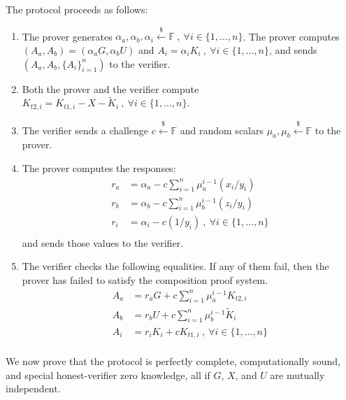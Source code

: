 \documentclass{article}
\theoremstyle{plain}
\theoremstyle{remark}
\begin{document}
The protocol proceeds as follows:
\begin{enumerate}
\item The prover generates $\alpha_a, \alpha_b, \alpha_i \xleftarrow{\$}\mathbb{F}\ ,\ \forall i\in\{1,\ldots,n\}$. The prover computes $(A_a, A_b) = (\alpha_a G, \alpha_b U)$ and $A_{i}=\alpha_i K_i\ ,\ \forall i\in\{1,\ldots,n\}$, and sends $(A_a, A_b, \{A_i\}_{i=1}^n)$ to the verifier.
\item Both the prover and the verifier compute $K_{t2,i} = K_{t1,i} - X - \tilde{K}_i\ ,\ \forall i\in\{1,\ldots,n\}$.
\item The verifier sends a challenge $c\xleftarrow{\$}\mathbb{F}$ and random scalars $\mu_a,\mu_b\xleftarrow{\$}\mathbb{F}$ to the prover.
\item The prover computes the responses:
\begin{align*}
r_{a} &= \alpha_a - c \sum_{i=1}^{n}{\mu_a^{i-1} (x_i/y_i)} \\
r_{b} &= \alpha_b - c \sum_{i=1}^{n}{\mu_b^{i-1}(z_i/y_i)} \\
r_{i} &= \alpha_i - c (1/y_i)\ ,\ \forall i\in\{1,\ldots,n\}\\
\end{align*}
and sends those values to the verifier.
\item The verifier checks the following equalities. If any of them fail, then the prover has failed to satisfy the composition proof system.
\begin{align*}
A_{a} &= r_a G + c \sum_{i=1}^{n}{\mu_a^{i-1} K_{t2,i}} \\
A_{b} &= r_b U + c \sum_{i=1}^{n}{\mu_b^{i-1} \tilde{K}_i} \\
A_{i} &= r_i K_i + c K_{t1,i}\ ,\ \forall i\in\{1,\ldots,n\}\\
\end{align*}
\end{enumerate}
We now prove that the protocol is perfectly complete, computationally sound, and special honest-verifier zero knowledge, all if $G$, $X$, and $U$ are mutually independent.
\end{document}
